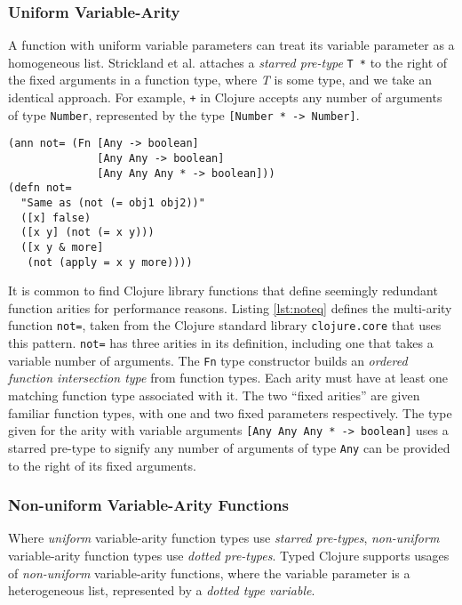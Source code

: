\subsubsection{Uniform Variable-Arity}

A function with uniform variable parameters can treat its variable parameter
as a homogeneous list. 
Strickland et al. attaches a \emph{starred pre-type} \lstinline|T *| to the right of the fixed arguments
in a function type, where \emph{T} is some type, and we take an identical approach.
For example, \lstinline|+| in Clojure accepts any number of arguments
of type \lstinline|Number|, represented by the type \lstinline|[Number * -> Number]|.


\begin{lstlisting}[caption=Typing multi-arity functions, label=lst:noteq]
(ann not= (Fn [Any -> boolean]
              [Any Any -> boolean]
              [Any Any Any * -> boolean]))
(defn not=
  "Same as (not (= obj1 obj2))"
  ([x] false)
  ([x y] (not (= x y)))
  ([x y & more]
   (not (apply = x y more))))
\end{lstlisting}

It is common to find Clojure library functions that define seemingly redundant
function arities for performance reasons.
Listing \ref{lst:noteq} defines the multi-arity function \lstinline|not=|,
taken from the Clojure standard library \lstinline|clojure.core| that uses this pattern.
\lstinline|not=| has three arities in its definition, including
one that takes a variable number of arguments.
The \lstinline|Fn| type constructor builds an \emph{ordered function intersection type} from
function types. Each arity must have at least one matching function type associated with it.
The two ``fixed arities'' are given familiar function types, with one and two fixed parameters respectively.
The type given for the arity with variable arguments \lstinline|[Any Any Any * -> boolean]|
uses a starred pre-type to signify any number of arguments of type \lstinline|Any|
can be provided to the right of its fixed arguments.

\subsubsection{Non-uniform Variable-Arity Functions}

Where \emph{uniform} variable-arity function types use \emph{starred pre-types}, \emph{non-uniform}
variable-arity function types use \emph{dotted pre-types}.
Typed Clojure supports usages of \emph{non-uniform} variable-arity functions,
where the variable parameter is a heterogeneous list, represented by a \emph{dotted type variable}.

